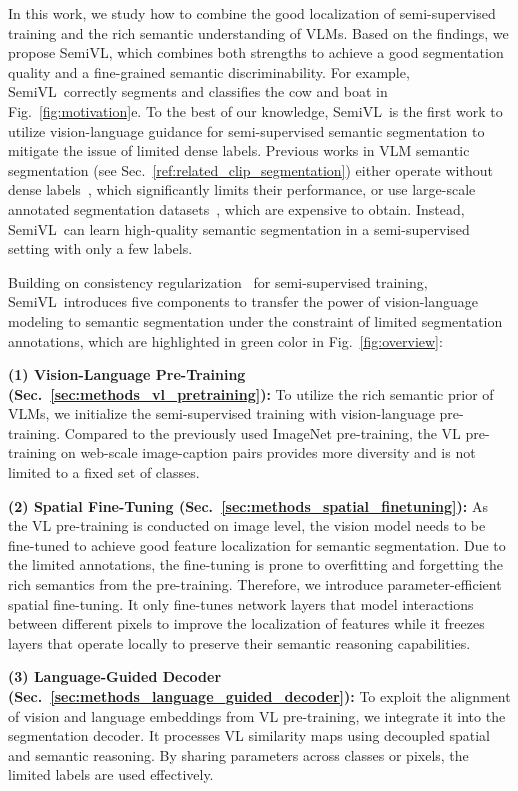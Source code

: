 \documentclass[10pt,twocolumn,letterpaper]{article}
\newcommand{\ours}{SemiVL}
\begin{document}
In this work, we study how to combine the good localization of semi-supervised training and the rich semantic understanding of VLMs. Based on the findings, we propose \ours, which combines both strengths to achieve a good segmentation quality and a fine-grained semantic discriminability. For example, \ours\ correctly segments and classifies the cow and boat in Fig.~\ref{fig:motivation}e. To the best of our knowledge, \ours\ is the first work to utilize vision-language guidance for semi-supervised semantic segmentation to mitigate the issue of limited dense labels.
Previous works in VLM semantic segmentation (see Sec.~\ref{ref:related_clip_segmentation}) either operate without dense labels~\cite{xu2022groupvit,zhou2022extract,cha2023learning}, which significantly limits their performance, or use large-scale annotated segmentation datasets~\cite{ding2022decoupling,zhou2023zegclip,xu2023side}, which are expensive to obtain. Instead, \ours\ can learn high-quality semantic segmentation in a semi-supervised setting with only a few labels.

Building on consistency regularization~\cite{yang2023revisiting} for semi-supervised training,
\ours\ introduces five components
to transfer the power of vision-language modeling to semantic segmentation under the constraint of limited segmentation annotations,
which are highlighted in green color in Fig.~\ref{fig:overview}:


\noindent\textbf{(1) Vision-Language Pre-Training (Sec.~\ref{sec:methods_vl_pretraining}):}
To utilize the rich semantic prior of VLMs, we initialize the semi-supervised training with vision-language pre-training. 
Compared to the previously used ImageNet pre-training, the VL pre-training on web-scale image-caption pairs provides more diversity and is not limited to a fixed set of classes.

\noindent\textbf{(2) Spatial Fine-Tuning (Sec.~\ref{sec:methods_spatial_finetuning}):}
As the VL pre-training is conducted on image level, the vision model needs to be fine-tuned to achieve good feature localization for semantic segmentation. Due to the limited annotations, the fine-tuning is prone to overfitting and forgetting the rich semantics from the pre-training. Therefore, we introduce parameter-efficient spatial fine-tuning.
It only fine-tunes network layers that model interactions between different pixels to improve the localization of features while it freezes layers that operate locally to preserve their semantic reasoning capabilities.

\noindent\textbf{(3) Language-Guided Decoder (Sec.~\ref{sec:methods_language_guided_decoder}):}
To exploit the alignment of vision and language embeddings from VL pre-training, we integrate it into the segmentation decoder.
It processes VL similarity maps using decoupled spatial and semantic reasoning. By sharing parameters across classes or pixels, the limited labels are used effectively.
\end{document}
